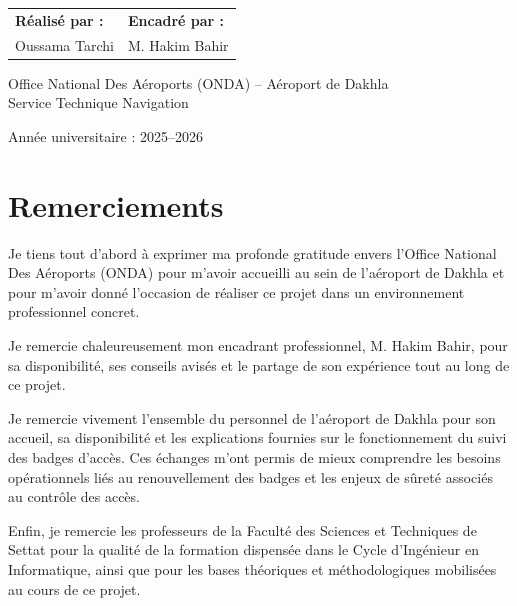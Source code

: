 \documentclass[12pt,a4paper,openany]{report}
\newcommand{\frontchapter}[1]{%
  \chapter*{#1}%
  \addcontentsline{toc}{chapter}{#1}%
}
\begin{document}
\begin{titlepage}
\begin{center}
  \begin{minipage}{0.88\textwidth}
    \begin{tabular}{@{}>{\raggedright\arraybackslash}p{} >{\raggedleft\arraybackslash}p{}@{}}
        \textbf{Réalisé par :} & \textbf{Encadré par :} \\[0.4cm]
        Oussama Tarchi & M. Hakim Bahir
    \end{tabular}
\end{minipage}

    \vspace{0.8cm}

    {\large
    Office National Des Aéroports (ONDA) -- Aéroport de Dakhla\\[0.25em]
    Service Technique Navigation}

    \vspace{0.5cm}

    {\large Année universitaire : 2025--2026}
  \end{center}
\end{titlepage}



\frontchapter{Remerciements}

Je tiens tout d'abord à exprimer ma profonde gratitude envers l'Office National
Des Aéroports (ONDA) pour m'avoir accueilli au sein de l'aéroport de Dakhla et
pour m'avoir donné l'occasion de réaliser ce projet dans un environnement
professionnel concret.

Je remercie chaleureusement mon encadrant professionnel, M. Hakim Bahir, pour
sa disponibilité, ses conseils avisés et le partage de son expérience tout au
long de ce projet.

Je remercie vivement l'ensemble du personnel de l'aéroport de Dakhla pour son
accueil, sa disponibilité et les explications fournies sur le fonctionnement du
suivi des badges d'accès. Ces échanges m'ont permis de mieux comprendre les
besoins opérationnels liés au renouvellement des badges et les enjeux de sûreté
associés au contrôle des accès.

Enfin, je remercie les professeurs de la Faculté des Sciences et Techniques de
Settat pour la qualité de la formation dispensée dans le Cycle d'Ingénieur en
Informatique, ainsi que pour les bases théoriques et méthodologiques mobilisées
au cours de ce projet.

\end{document}
